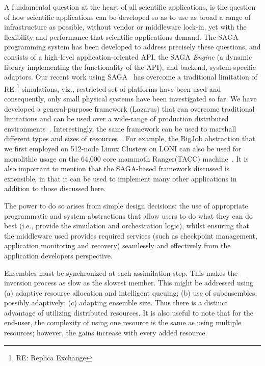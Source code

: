 \documentclass{acm_proc_article-sp}
\begin{document}
A fundamental question at the heart of all scientific applications, is
the question of how scientific applications can be developed so as to
use as broad a range of infrastructure as possible, without vendor or
middleware lock-in, yet with the flexibility and performance that
scientific applications demand. The SAGA programming system has been
developed to address precisely these questions, and consists of a
high-level application-oriented API, the SAGA {\it Engine} (a dynamic
library implementing the functionality of the API), and backend,
system-specific adaptors.  Our recent work using
SAGA~\cite{saga-papers} has overcome a traditional limitation of RE \footnote{RE: Replica Exchange}
simulations, viz., restricted set of platforms have been used and
consequently, only small physical systems have been investigated so
far. We have developed a general-purpose framework (Lazarus) that can overcome
traditional limitations and can be used over a wide-range of
production distributed environments~\cite{saga-royalsoc}.
Interestingly, the same framework can be used to marshall different
types and sizes of resources~\cite{saga-papers}. For example, the
BigJob abstraction that we first employed on 512-node Linux Clusters
on LONI can also be used for monolithic usage on the 64,000 core
mammoth Ranger(TACC) machine~\cite{saga-iccs09}.  It is also important
to mention that the SAGA-based framework discussed is extensible, in
that it can be used to implement many other applications in addition
to those discussed here.

The power to do so arises from simple design decisions: the use of
appropriate programmatic and system abstractions that allow users to
do what they can do best (i.e., provide the simulation and
orchestration logic), whilst ensuring that the middleware used
provides required services (such as checkpoint management, application
monitoring and recovery) seamlessly and effectively from the
application developers perspective. 

Ensembles must be synchronized at each assimilation step. This makes
the inversion process as slow as the slowest member. This might be
addressed using (a) adaptive resource allocation and intelligent
queuing; (b) use of subensembles, possibly adaptively; (c) adapting
ensemble size.  Thus there is a distinct advantage of utilizing
distributed resources.  It is also useful to note that for the end-user, the
complexity of using one resource is the same as using multiple
resources; however, the gains increase with every added resource.
\end{document}
